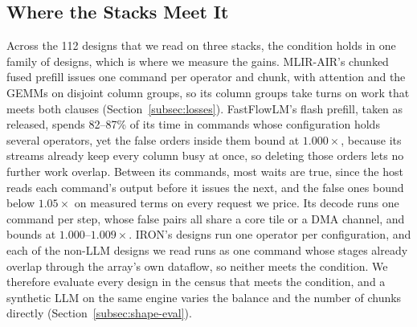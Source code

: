 \subsection{Where the Stacks Meet It}
\label{subsec:observed}

Across the 112 designs that we read on three stacks, the condition holds in one family of designs, which is where we measure the gains.
MLIR-AIR's chunked fused prefill issues one command per operator and chunk, with attention and the GEMMs on disjoint column groups, so its column groups take turns on work that meets both clauses (Section~\ref{subsec:losses}).
FastFlowLM's flash prefill, taken as released, spends 82--87\% of its time in commands whose configuration holds several operators, yet the false orders inside them bound at $1.000\times$, because its streams already keep every column busy at once, so deleting those orders lets no further work overlap.
Between its commands, most waits are true, since the host reads each command's output before it issues the next, and the false ones bound below $1.05\times$ on measured terms on every request we price.
Its decode runs one command per step, whose false pairs all share a core tile or a DMA channel, and bounds at $1.000$--$1.009\times$.
IRON's designs run one operator per configuration, and each of the non-LLM designs we read runs as one command whose stages already overlap through the array's own dataflow, so neither meets the condition.
We therefore evaluate every design in the census that meets the condition, and a synthetic LLM on the same engine varies the balance and the number of chunks directly (Section~\ref{subsec:shape-eval}).
